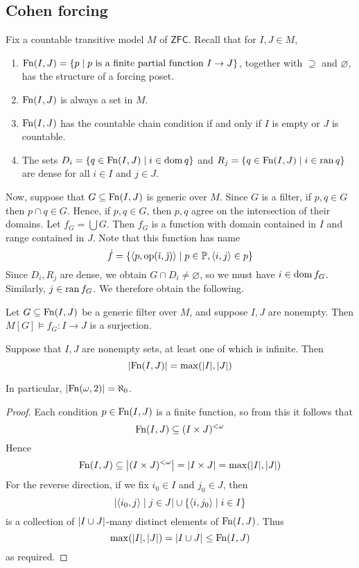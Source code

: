 \subsection{Cohen forcing}
Fix a countable transitive model \( M \) of \( \mathsf{ZFC} \).
Recall that for \( I, J \in M \),
\begin{enumerate}
    \item \( \operatorname{Fn}(I, J) = \qty{p \mid p \text{ is a finite partial function } I \to J} \), together with \( \supseteq \) and \( \varnothing \), has the structure of a forcing poset.
    \item \( \operatorname{Fn}(I, J) \) is always a set in \( M \).
    \item \( \operatorname{Fn}(I, J) \) has the countable chain condition if and only if \( I \) is empty or \( J \) is countable.
    \item The sets \( D_i = \qty{q \in \operatorname{Fn}(I, J) \mid i \in \operatorname{dom}q} \) and \( R_j = \qty{q \in \operatorname{Fn}(I, J) \mid i \in \operatorname{ran}q} \) are dense for all \( i \in I \) and \( j \in J \).
\end{enumerate}
Now, suppose that \( G \subseteq \operatorname{Fn}(I, J) \) is generic over \( M \).
Since \( G \) is a filter, if \( p, q \in G \) then \( p \cap q \in G \).
Hence, if \( p, q \in G \), then \( p, q \) agree on the intersection of their domains.
Let \( f_G = \bigcup G \).
Then \( f_G \) is a function with domain contained in \( I \) and range contained in \( J \).
Note that this function has name
\[ \dot f = \qty{\langle p, \operatorname{op}(\check \imath, \check \jmath) \rangle \mid p \in \mathbb P, \langle i, j \rangle \in p} \]
Since \( D_i, R_j \) are dense, we obtain \( G \cap D_i \neq \varnothing \), so we must have \( i \in \operatorname{dom} f_G \).
Similarly, \( j \in \operatorname{ran} f_G \).
We therefore obtain the following.
\begin{proposition}
    Let \( G \subseteq \operatorname{Fn}(I, J) \) be a generic filter over \( M \), and suppose \( I, J \) are nonempty.
    Then \( M[G] \vDash f_G : I \to J \) is a surjection.
\end{proposition}
\begin{proposition}
    Suppose that \( I, J \) are nonempty sets, at least one of which is infinite.
    Then
    \[ \abs{\operatorname{Fn}(I, J)} = \max(\abs{I}, \abs{J}) \]
\end{proposition}
In particular, \( \abs{\operatorname{Fn}(\omega, 2)} = \aleph_0 \).
\begin{proof}
    Each condition \( p \in \operatorname{Fn}(I, J) \) is a finite function, so from this it follows that
    \[ \operatorname{Fn}(I, J) \subseteq (I \times J)^{<\omega} \]
    Hence
    \[ \operatorname{Fn}(I, J) \subseteq \abs{(I \times J)^{<\omega}} = \abs{I \times J} = \max(\abs{I}, \abs{J}) \]
    For the reverse direction, if we fix \( i_0 \in I \) and \( j_0 \in J \), then
    \[ \abs{\langle i_0, j \rangle \mid j \in J} \cup \qty{\langle i, j_0 \rangle \mid i \in I} \]
    is a collection of \( \abs{I \cup J} \)-many distinct elements of \( \operatorname{Fn}(I, J) \).
    Thus
    \[ \max(\abs{I}, \abs{J}) = \abs{I \cup J} \leq \operatorname{Fn}(I, J) \]
    as required.
\end{proof}
